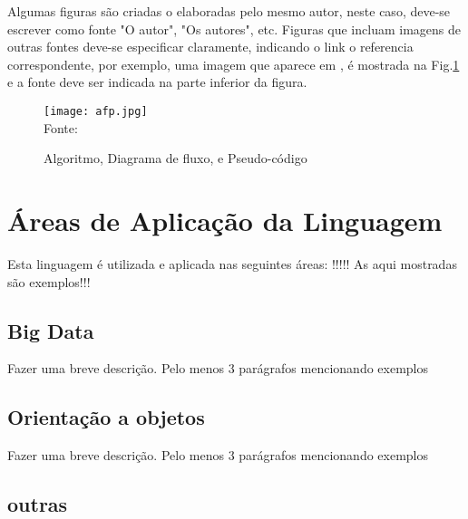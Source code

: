 Algumas figuras s\~{a}o criadas o elaboradas pelo mesmo autor, neste caso, deve-se escrever como fonte "O autor", "Os autores", etc. Figuras que incluam imagens de outras fontes deve-se especificar claramente, indicando o link o referencia correspondente, por exemplo, uma imagem que aparece em \cite[p. 93]{Sprankle2012}, \'{e} mostrada na Fig.\ref{afp} e a fonte deve ser indicada na parte inferior da figura.
   \begin{figure}[H]
    \begin{center}
        \caption{Algoritmo, Diagrama de fluxo, e Pseudo-c\'{o}digo} \label{afp}
        \texttt{[image: afp.jpg]} \\
        {\tiny \sf Fonte: \cite[p. 93]{Sprankle2012} }
    \end{center}
   \end{figure}

   \section{\'{A}reas de Aplica\c{c}\~{a}o da Linguagem}
   Esta linguagem \'{e} utilizada e aplicada nas seguintes \'{a}reas: !!!!! As aqui mostradas s\~{a}o exemplos!!!

        \subsection{ Big Data}
        Fazer uma breve descri\c{c}\~{a}o. Pelo menos 3 par\'{a}grafos mencionando exemplos

        \subsection{ Orienta\c{c}\~{a}o a objetos}
        Fazer uma breve descri\c{c}\~{a}o. Pelo menos 3 par\'{a}grafos mencionando exemplos

        \subsection{ outras} 
